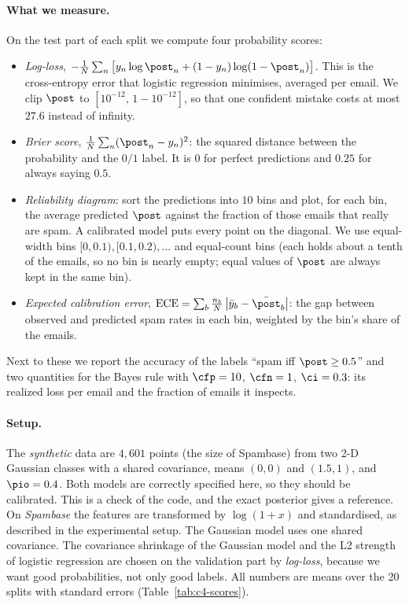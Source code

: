 \paragraph{What we measure.}
On the test part of each split we compute four probability scores:
\begin{itemize}[itemsep=1pt,topsep=2pt]
  \item \emph{Log-loss}, $-\frac1N\sum_n\big[y_n\log\post_n + (1-y_n)\log(1-\post_n)\big]$. This is the
        cross-entropy error that logistic regression minimises, averaged per email. We clip $\post$ to
        $[10^{-12},\,1-10^{-12}]$, so that one confident mistake costs at most $27.6$ instead of infinity.
  \item \emph{Brier score}, $\frac1N\sum_n(\post_n-y_n)^2$: the squared distance between the probability and
        the $0/1$ label. It is $0$ for perfect predictions and $0.25$ for always saying $0.5$.
  \item \emph{Reliability diagram}: sort the predictions into $10$ bins and plot, for each bin, the average
        predicted $\post$ against the fraction of those emails that really are spam. A calibrated model puts
        every point on the diagonal. We use equal-width bins $[0,0.1),[0.1,0.2),\dots$ and equal-count bins
        (each holds about a tenth of the emails, so no bin is nearly empty; equal values of $\post$ are always
        kept in the same bin).
  \item \emph{Expected calibration error}, $\mathrm{ECE} = \sum_b \frac{n_b}{N}\,
        \big|\bar y_b - \bar\post_b\big|$: the gap between observed and predicted spam rates in each bin,
        weighted by the bin's share of the emails.
\end{itemize}
Next to these we report the accuracy of the labels ``spam iff $\post\ge0.5$'' and two quantities for the
Bayes rule with $\cfp=10$, $\cfn=1$, $\ci=0.3$: its realized loss per email and the fraction of emails it
inspects.

\paragraph{Setup.}
The \emph{synthetic} data are $4{,}601$ points (the size of Spambase) from two 2-D Gaussian classes with a
shared covariance, means $(0,0)$ and $(1.5,1)$, and $\pio=0.4$. Both models are correctly specified here,
so they should be calibrated. This is a check of the code, and the exact posterior gives a reference.
On \emph{Spambase} the features are transformed by $\log(1+x)$ and standardised, as described in the experimental setup. The Gaussian
model uses one shared covariance. The covariance shrinkage of the Gaussian model and the L2 strength of
logistic regression are chosen on the validation part by \emph{log-loss}, because we want good
probabilities, not only good labels. All numbers are means over the 20 splits with standard errors
(Table~\ref{tab:c4-scores}).

